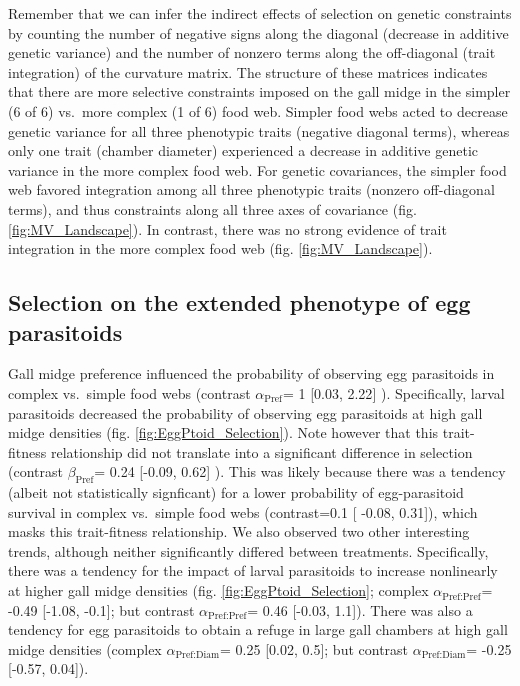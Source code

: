 \documentclass[11pt,]{article}
\begin{document}
Remember that we can infer the indirect effects of selection on genetic
constraints by counting the number of negative signs along the diagonal
(decrease in additive genetic variance) and the number of nonzero terms
along the off-diagonal (trait integration) of the curvature matrix. The
structure of these matrices indicates that there are more selective
constraints imposed on the gall midge in the simpler (6 of 6) vs.~more
complex (1 of 6) food web. Simpler food webs acted to decrease genetic
variance for all three phenotypic traits (negative diagonal terms),
whereas only one trait (chamber diameter) experienced a decrease in
additive genetic variance in the more complex food web. For genetic
covariances, the simpler food web favored integration among all three
phenotypic traits (nonzero off-diagonal terms), and thus constraints
along all three axes of covariance (fig. \ref{fig:MV_Landscape}). In
contrast, there was no strong evidence of trait integration in the more
complex food web (fig. \ref{fig:MV_Landscape}).

\subsection{Selection on the extended phenotype of egg
parasitoids}\label{selection-on-the-extended-phenotype-of-egg-parasitoids}

Gall midge preference influenced the probability of observing egg
parasitoids in complex vs.~simple food webs (contrast
\(\alpha_{\text{Pref}}\)= 1 {[}0.03, 2.22{]} ). Specifically, larval
parasitoids decreased the probability of observing egg parasitoids at
high gall midge densities (fig. \ref{fig:EggPtoid_Selection}). Note
however that this trait-fitness relationship did not translate into a
significant difference in selection (contrast \(\beta_{\text{Pref}}\)=
0.24 {[}-0.09, 0.62{]} ). This was likely because there was a tendency
(albeit not statistically signficant) for a lower probability of
egg-parasitoid survival in complex vs.~simple food webs (contrast=0.1
{[} -0.08, 0.31{]}), which masks this trait-fitness relationship. We
also observed two other interesting trends, although neither
significantly differed between treatments. Specifically, there was a
tendency for the impact of larval parasitoids to increase nonlinearly at
higher gall midge densities (fig. \ref{fig:EggPtoid_Selection}; complex
\(\alpha_{\text{Pref:Pref}}\)= -0.49 {[}-1.08, -0.1{]}; but contrast
\(\alpha_{\text{Pref:Pref}}\)= 0.46 {[}-0.03, 1.1{]}). There was also a
tendency for egg parasitoids to obtain a refuge in large gall chambers
at high gall midge densities (complex \(\alpha_{\text{Pref:Diam}}\)=
0.25 {[}0.02, 0.5{]}; but contrast \(\alpha_{\text{Pref:Diam}}\)= -0.25
{[}-0.57, 0.04{]}).
\end{document}

